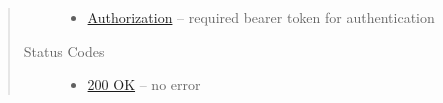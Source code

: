\documentclass[letterpaper,10pt,english]{sphinxmanual}
\begin{document}
\begin{fulllineitems}
\begin{quote}
\begin{description}
\begin{itemize}
\item {} 
\href{http://tools.ietf.org/html/rfc7235\#section-4.2}{Authorization} -- required bearer token for authentication

\end{itemize}

\item[{Status Codes}] \leavevmode\begin{itemize}
\item {} 
\href{http://www.w3.org/Protocols/rfc2616/rfc2616-sec10.html\#sec10.2.1}{200 OK} -- no error

\end{itemize}

\end{description}\end{quote}

\end{fulllineitems}
\end{document}
